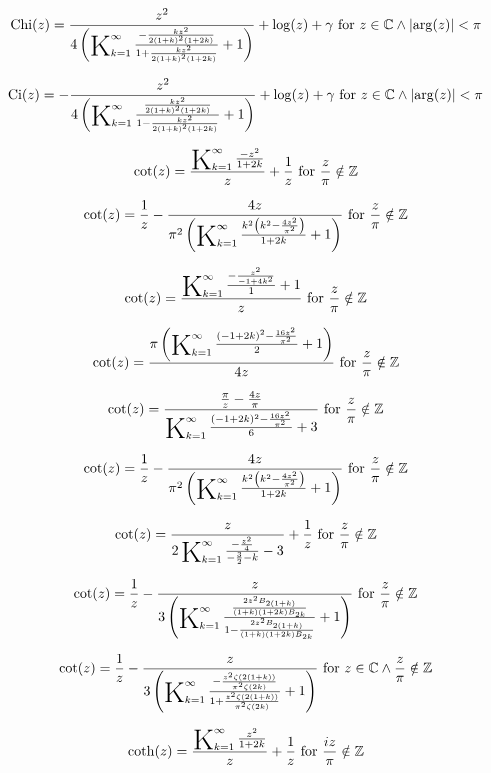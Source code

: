 \documentclass{article}
\newcommand{\bigK}{\mathop{\raisebox{-5pt}{\huge K}}}
\begin{document}
\[\text{Chi}(z)=\frac{z^2}{4 \left(\bigK_{k=1}^{\infty}\frac{-\frac{k z^2}{2 (1+k)^2 (1+2 k)}}{1+\frac{k z^2}{2 (1+k)^2 (1+2 k)}}+1\right)}+\log (z)+\gamma \text{ for }z\in \mathbb{C}\land \left| \arg (z)\right| <\pi\] 

\[\text{Ci}(z)=-\frac{z^2}{4 \left(\bigK_{k=1}^{\infty}\frac{\frac{k z^2}{2 (1+k)^2 (1+2 k)}}{1-\frac{k z^2}{2 (1+k)^2 (1+2 k)}}+1\right)}+\log (z)+\gamma \text{ for }z\in \mathbb{C}\land \left| \arg (z)\right| <\pi\] 

\[\cot (z)=\frac{\bigK_{k=1}^{\infty}\frac{-z^2}{1+2 k}}{z}+\frac{1}{z}\text{ for }\frac{z}{\pi }\notin \mathbb{Z}\] 

\[\cot (z)=\frac{1}{z}-\frac{4 z}{\pi ^2 \left(\bigK_{k=1}^{\infty}\frac{k^2 \left(k^2-\frac{4 z^2}{\pi ^2}\right)}{1+2 k}+1\right)}\text{ for }\frac{z}{\pi }\notin \mathbb{Z}\] 

\[\cot (z)=\frac{\bigK_{k=1}^{\infty}\frac{-\frac{z^2}{-1+4 k^2}}{1}+1}{z}\text{ for }\frac{z}{\pi }\notin \mathbb{Z}\] 

\[\cot (z)=\frac{\pi  \left(\bigK_{k=1}^{\infty}\frac{(-1+2 k)^2-\frac{16 z^2}{\pi ^2}}{2}+1\right)}{4 z}\text{ for }\frac{z}{\pi }\notin \mathbb{Z}\] 

\[\cot (z)=\frac{\frac{\pi }{z}-\frac{4 z}{\pi }}{\bigK_{k=1}^{\infty}\frac{(-1+2 k)^2-\frac{16 z^2}{\pi ^2}}{6}+3}\text{ for }\frac{z}{\pi }\notin \mathbb{Z}\] 

\[\cot (z)=\frac{1}{z}-\frac{4 z}{\pi ^2 \left(\bigK_{k=1}^{\infty}\frac{k^2 \left(k^2-\frac{4 z^2}{\pi ^2}\right)}{1+2 k}+1\right)}\text{ for }\frac{z}{\pi }\notin \mathbb{Z}\] 

\[\cot (z)=\frac{z}{2 \bigK_{k=1}^{\infty}\frac{-\frac{z^2}{4}}{-\frac{3}{2}-k}-3}+\frac{1}{z}\text{ for }\frac{z}{\pi }\notin \mathbb{Z}\] 

\[\cot (z)=\frac{1}{z}-\frac{z}{3 \left(\bigK_{k=1}^{\infty}\frac{\frac{2 z^2 B_{2 (1+k)}}{(1+k) (1+2 k) B_{2 k}}}{1-\frac{2 z^2 B_{2 (1+k)}}{(1+k) (1+2 k) B_{2 k}}}+1\right)}\text{ for }\frac{z}{\pi }\notin \mathbb{Z}\] 

\[\cot (z)=\frac{1}{z}-\frac{z}{3 \left(\bigK_{k=1}^{\infty}\frac{-\frac{z^2 \zeta (2 (1+k))}{\pi ^2 \zeta (2 k)}}{1+\frac{z^2 \zeta (2 (1+k))}{\pi ^2 \zeta (2 k)}}+1\right)}\text{ for }z\in \mathbb{C}\land \frac{z}{\pi }\notin \mathbb{Z}\] 

\[\coth (z)=\frac{\bigK_{k=1}^{\infty}\frac{z^2}{1+2 k}}{z}+\frac{1}{z}\text{ for }\frac{i z}{\pi }\notin \mathbb{Z}\] 
\end{document}
